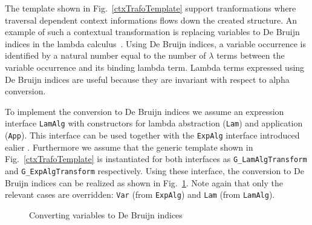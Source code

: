 The template shown in Fig.~\ref{ctxTrafoTemplate} support tranformations where traversal dependent context informations flows down the created structure.
An example of such a contextual transformation is replacing variables  to De Bruijn indices in the lambda calculus~\cite{deBruijn1972381}.
Using De Bruijn indices, a variable occurrence is identified by a natural number equal to the number of $\lambda$ terms between the variable occurrence and its binding lambda term.
Lambda terms expressed using De Bruijn indices are useful because they are invariant with respect to alpha conversion.

To implement the conversion to De Bruijn indices we assume an expression interface \lstinline{LamAlg} with constructors for lambda abstraction (\lstinline{Lam}) and application (\lstinline{App}).
This interface can be used together with the \lstinline{ExpAlg} interface introduced ealier .
Furthermore we assume that the generic template shown in Fig.~\ref{ctxTrafoTemplate} is instantiated for both interfaces as \lstinline{G_LamAlgTransform} and \lstinline{G_ExpAlgTransform} respectively.
Using these interface, the conversion to De Bruijn indices can be realized as shown in Fig.~\ref{DeBruijn}.
Note again that only the relevant cases are overridden: \lstinline{Var} (from \lstinline{ExpAlg}) and \lstinline{Lam} (from \lstinline{LamAlg}).



\begin{figure}[t]
\vspace{-.1in}
\caption{Converting variables to De Bruijn indices}
\label{DeBruijn}
\end{figure}




